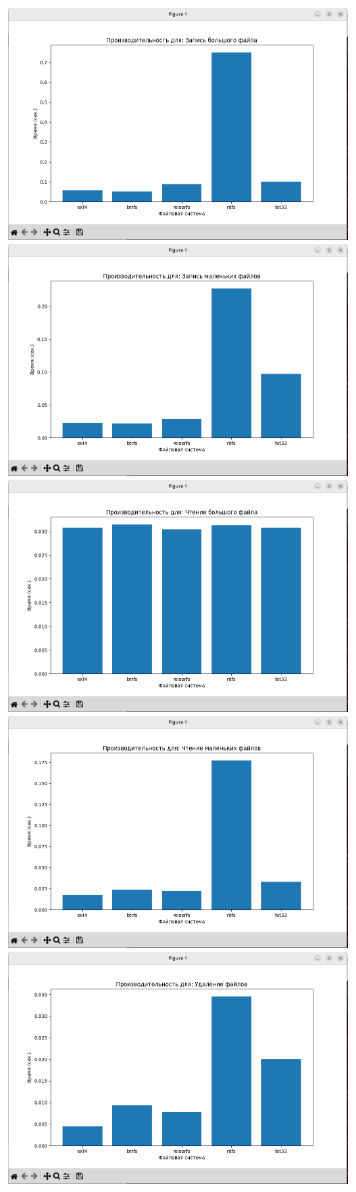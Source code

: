 \documentclass[a4paper,14pt]{extarticle}
\begin{document}
\includegraphics[width=90mm]{task2_e.png}
\includegraphics[width=90mm]{task2_f.png}\\
\includegraphics[width=90mm]{task2_g.png}
\includegraphics[width=90mm]{task2_h.png}\\
\includegraphics[width=90mm]{task2_i.png}
\end{document}
